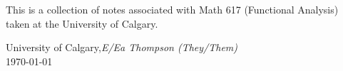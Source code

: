 %
%

\preface

This is a collection of notes associated with Math 617 (Functional Analysis) taken at the University of Calgary.
 

\vspace{\baselineskip}
\begin{flushright}\noindent
University of Calgary,\hfill {\it E/Ea Thompson (They/Them)}\\
\today \hfill \\
\end{flushright}


